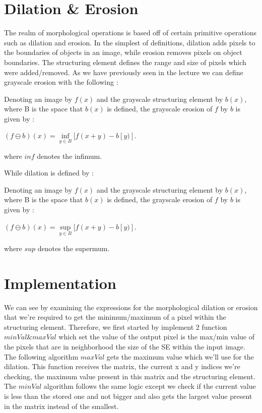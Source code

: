 \documentclass{article}
\begin{document}
\section{Dilation \& Erosion}
The realm of morphological operations is based off of certain primitive operations such as dilation and erosion. In the simplest of definitions, dilation adds pixels to the boundaries of objects in an image, while erosion removes pixels on object boundaries. The structuring element defines the range and size of pixels which were added/removed. 
\newline
As we have previously seen in the lecture we can define grayscale erosion with the following : \newline
\begin{tcolorbox}
Denoting an image by $f(x)$ and the grayscale structuring element by $b(x)$, where B is the space that $b(x)$ is defined, the grayscale erosion of $f$ by $b$ is given by :
\newline
\begin{center}
$(f \ominus b)(x) = \inf\limits_{y \in B}[f(x + y) - b[y)]$.
\end{center}

where $inf$ denotes the infimum.
\end{tcolorbox}
While dilation is defined by :
\newline
\begin{tcolorbox}
Denoting an image by $f(x)$ and the grayscale structuring element by $b(x)$, where B is the space that $b(x)$ is defined, the grayscale erosion of $f$ by $b$ is given by :
\newline
\begin{center}
$(f \ominus b)(x) = \sup\limits_{y \in B}[f(x + y) - b[y)]$.
\end{center}

where $sup$ denotes the supermum.
\end{tcolorbox}
\section{Implementation}

We can see by examining the expressions for the morphological dilation or erosion that we're required to get the minimum/maximum of a pixel within the structuring element. Therefore, we first started by implement 2 function $minVal \& maxVal$ which set the value of the output pixel is the max/min value of the pixels that are in neighborhood the size of the SE within the input image. The following algorithm $maxVal$ gets the maximum value which we'll use for the dilation. This function receives the matrix, the current x and y indices we're checking, the maximum value present in this matrix and the structuring element. The $minVal$ algorithm follows the same logic except we check if the current value is less than the stored one and not bigger and also gets the largest value present in the matrix instead of the smallest. 
\end{document}
